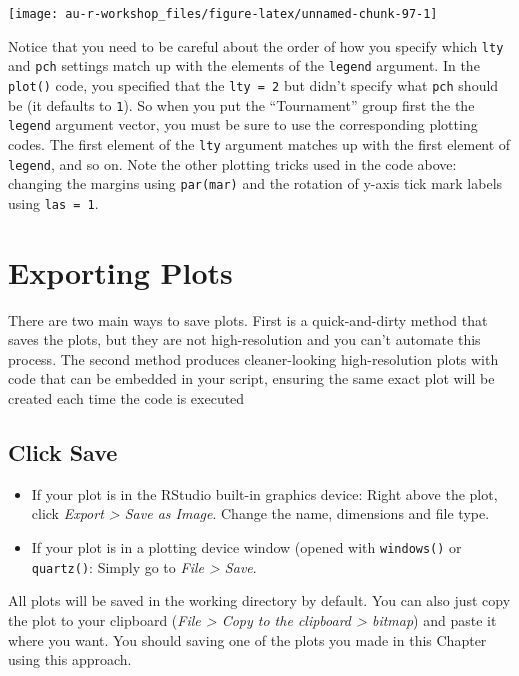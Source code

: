 \documentclass[]{book}
\providecommand{\tightlist}{%
  \setlength{\itemsep}{0pt}\setlength{\parskip}{0pt}}
\theoremstyle{definition}
\theoremstyle{definition}
\theoremstyle{definition}
\theoremstyle{remark}
\begin{document}
\begin{center}\texttt{[image: au-r-workshop\_files/figure-latex/unnamed-chunk-97-1]} \end{center}

Notice that you need to be careful about the order of how you specify
which \texttt{lty} and \texttt{pch} settings match up with the elements
of the \texttt{legend} argument. In the \texttt{plot()} code, you
specified that the \texttt{lty\ =\ 2} but didn't specify what
\texttt{pch} should be (it defaults to \texttt{1}). So when you put the
``Tournament'' group first the the \texttt{legend} argument vector, you
must be sure to use the corresponding plotting codes. The first element
of the \texttt{lty} argument matches up with the first element of
\texttt{legend}, and so on. Note the other plotting tricks used in the
code above: changing the margins using \texttt{par(mar)} and the
rotation of y-axis tick mark labels using \texttt{las\ =\ 1}.

\section{Exporting Plots}\label{exporting-plots}

There are two main ways to save plots. First is a quick-and-dirty method
that saves the plots, but they are not high-resolution and you can't
automate this process. The second method produces cleaner-looking
high-resolution plots with code that can be embedded in your script,
ensuring the same exact plot will be created each time the code is
executed

\subsection{Click Save}\label{click-save}

\begin{itemize}
\tightlist
\item
  If your plot is in the RStudio built-in graphics device: Right above
  the plot, click \emph{Export \textgreater{} Save as Image}. Change the
  name, dimensions and file type.
\item
  If your plot is in a plotting device window (opened with
  \texttt{windows()} or \texttt{quartz()}: Simply go to \emph{File
  \textgreater{} Save}.
\end{itemize}

All plots will be saved in the working directory by default. You can
also just copy the plot to your clipboard (\emph{File \textgreater{}
Copy to the clipboard \textgreater{} bitmap}) and paste it where you
want. You should saving one of the plots you made in this Chapter using
this approach.
\end{document}
